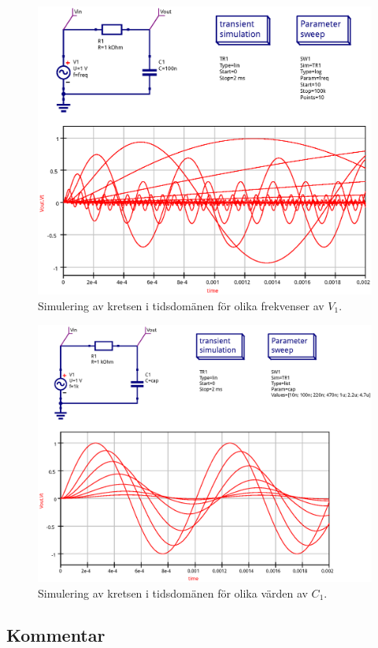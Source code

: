 \begin{figure}[ht]\label{fig:bode-sim-tran}
  \centering
  \includegraphics[width=\linewidth]{sim/ee466_lab-4_prj/uppgift-1_tran}
  \caption[] {Simulering av kretsen i tidsdomänen för olika frekvenser av $V_1$.}
\end{figure}

\begin{figure}[ht]\label{fig:bode-sim-param}
  \centering
  \includegraphics[width=\linewidth]{sim/ee466_lab-4_prj/uppgift-1_param}
  \caption[] {Simulering av kretsen i tidsdomänen för olika värden av $C_1$.}
\end{figure}


\subsection{Kommentar}\label{}


